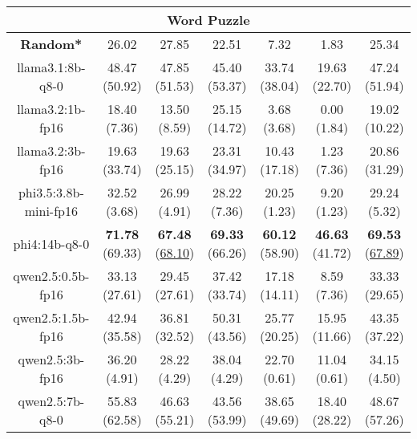 \begin{table}[hbp]
{\begin{tabular}{ccccccc}
      \hline
      \multicolumn{7}{c}{Word Puzzle} \\ \hline
      \multicolumn{1}{c|}{\textbf{Random*}} & 26.02 & 27.85 & \multicolumn{1}{c|}{22.51} & 7.32 & \multicolumn{1}{c|}{1.83} & 25.34 \\ \hline

      \multicolumn{1}{c|}{llama3.1:8b-q8-0} & 48.47 (50.92) & 47.85 (51.53) & \multicolumn{1}{c|}{45.40 (53.37)} & 33.74 (38.04) & \multicolumn{1}{c|}{19.63 (22.70)} & 47.24 (51.94) \\

      \multicolumn{1}{c|}{llama3.2:1b-fp16} & 18.40 (7.36) & 13.50 (8.59) & \multicolumn{1}{c|}{25.15 (14.72)} & 3.68 (3.68) & \multicolumn{1}{c|}{0.00 (1.84)} & 19.02 (10.22) \\

      \multicolumn{1}{c|}{llama3.2:3b-fp16} & 19.63 (33.74) & 19.63 (25.15) & \multicolumn{1}{c|}{23.31 (34.97)} & 10.43 (17.18) & \multicolumn{1}{c|}{1.23 (7.36)} & 20.86 (31.29) \\

      \multicolumn{1}{c|}{phi3.5:3.8b-mini-fp16} & 32.52 (3.68) & 26.99 (4.91) & \multicolumn{1}{c|}{28.22 (7.36)} & 20.25 (1.23) & \multicolumn{1}{c|}{9.20 (1.23)} & 29.24 (5.32) \\

      \multicolumn{1}{c|}{phi4:14b-q8-0} & \textbf{71.78} (69.33) & \textbf{67.48} (\underline{68.10}) & \multicolumn{1}{c|}{\textbf{69.33} (66.26)} & \textbf{60.12} (58.90) & \multicolumn{1}{c|}{\textbf{46.63} (41.72)} & \textbf{69.53} (\underline{67.89}) \\

      \multicolumn{1}{c|}{qwen2.5:0.5b-fp16} & 33.13 (27.61) & 29.45 (27.61) & \multicolumn{1}{c|}{37.42 (33.74)} & 17.18 (14.11) & \multicolumn{1}{c|}{8.59 (7.36)} & 33.33 (29.65) \\

      \multicolumn{1}{c|}{qwen2.5:1.5b-fp16} & 42.94 (35.58) & 36.81 (32.52) & \multicolumn{1}{c|}{50.31 (43.56)} & 25.77 (20.25) & \multicolumn{1}{c|}{15.95 (11.66)} & 43.35 (37.22) \\

      \multicolumn{1}{c|}{qwen2.5:3b-fp16} & 36.20 (4.91) & 28.22 (4.29) & \multicolumn{1}{c|}{38.04 (4.29)} & 22.70 (0.61) & \multicolumn{1}{c|}{11.04 (0.61)} & 34.15 (4.50) \\

      \multicolumn{1}{c|}{qwen2.5:7b-q8-0} & 55.83 (62.58) & 46.63 (55.21) & \multicolumn{1}{c|}{43.56 (53.99)} & 38.65 (49.69) & \multicolumn{1}{c|}{18.40 (28.22)} & 48.67 (57.26) \\


\end{tabular}}
\end{table}
